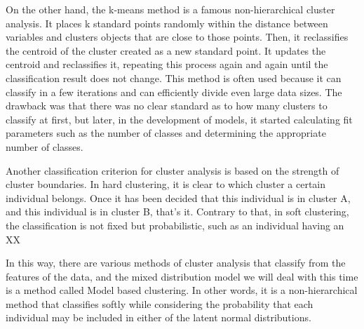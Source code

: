 \documentclass{ltjsbook}
\begin{document}
On the other hand, the k-means method is a famous non-hierarchical cluster analysis. It places k standard points randomly within the distance between variables and clusters objects that are close to those points. Then, it reclassifies the centroid of the cluster created as a new standard point. It updates the centroid and reclassifies it, repeating this process again and again until the classification result does not change. This method is often used because it can classify in a few iterations and can efficiently divide even large data sizes. The drawback was that there was no clear standard as to how many clusters to classify at first, but later, in the development of models, it started calculating fit parameters such as the number of classes and determining the appropriate number of classes.


Another classification criterion for cluster analysis is based on the strength of cluster boundaries. In hard clustering, it is clear to which cluster a certain individual belongs. Once it has been decided that this individual is in cluster A, and this individual is in cluster B, that's it. Contrary to that, in soft clustering, the classification is not fixed but probabilistic, such as an individual having an XX%

In this way, there are various methods of cluster analysis that classify from the features of the data, and the mixed distribution model we will deal with this time is a method called Model based clustering. In other words, it is a non-hierarchical method that classifies softly while considering the probability that each individual may be included in either of the latent normal distributions.
\end{document}
